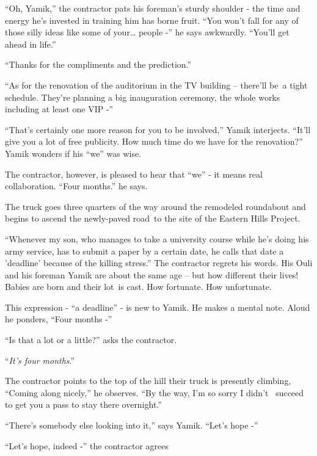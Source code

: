 \documentclass[twoside,11pt]{book}
\begin{document}
``Oh, Yamik,'' the contractor pats his foreman's sturdy shoulder - the time and energy he's
invested in training him has borne fruit. ``You won't fall for any of those silly ideas like some of
your{\dots} people -'' he says awkwardly. ``You'll get ahead in life.''

``Thanks for the compliments and the prediction.''

``As for the renovation of the auditorium in the TV building -- there'll be~a tight schedule. They're
planning a big inauguration ceremony, the whole works including at least one VIP -''

``That's certainly one more reason for you to be involved,'' Yamik interjects.
``It'll give you a lot of free publicity. How much time do we have for the renovation?''
Yamik wonders if his ``we'' was wise.

The contractor, however, is pleased to hear that ``we'' - it means real collaboration. ``Four
months.'' he says.

The truck goes three quarters of the way around the remodeled roundabout and begins to ascend the newly-paved road~to
the site of the Eastern Hills Project.

``Whenever my son, who manages{ }to take a university course while he's doing his army
service, has to submit a paper by a certain date, he calls that date a 'deadline' because of the killing
stress.'' The contractor regrets his words. His Ouli and his foreman Yamik are about the same age -- but
how different their lives! Babies are born and their lot~is cast. How fortunate. How unfortunate.

This expression - ``a deadline'' - is new to Yamik. He makes a mental note. Aloud he ponders,
``Four months -''

``Is that a lot or a little?'' asks the contractor.

``\textit{It's four months}.''

The contractor points to the top of the hill their truck is presently climbing, ``Coming along nicely,'' he
observes. ``By the way, I'm so sorry I didn't \ succeed to get you a pass to stay there overnight.''

``There's somebody else looking into it,'' says Yamik. ``Let's hope
-''

``Let's hope, indeed -'' the contractor agrees


\bigskip

\chapter{}
\end{document}
